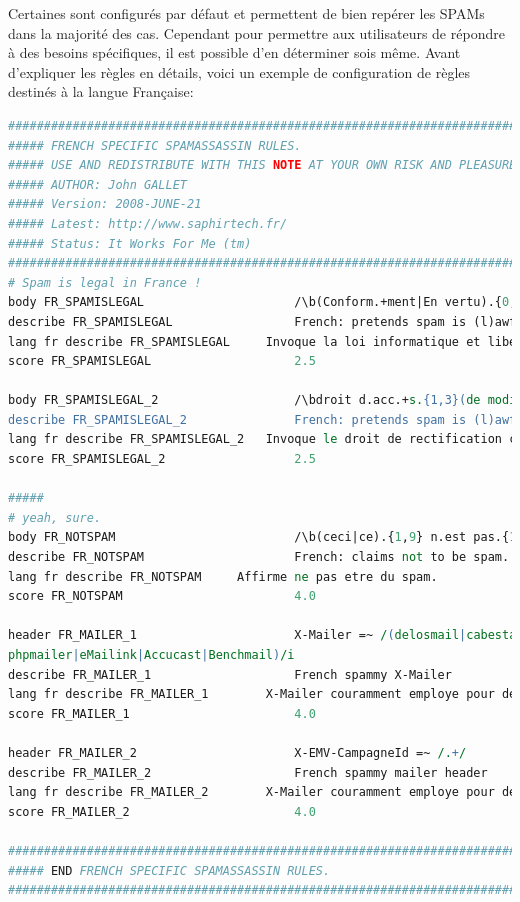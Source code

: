 \documentclass[a4paper,11pt]{article}
\begin{document}
Certaines sont configurés par défaut et permettent de
bien repérer les SPAMs dans la majorité des cas. Cependant pour permettre aux utilisateurs de répondre à des besoins spécifiques,
il est possible d'en déterminer sois même.
\linebreak
Avant d'expliquer les règles en détails, voici un exemple de configuration de règles destinés à la langue Française:
\begin{tiny}
\lstset{numbers=left}
\begin{lstlisting}[language=perl,frame=L,breaklines=true]
#####################################################################################
##### FRENCH SPECIFIC SPAMASSASSIN RULES. 
##### USE AND REDISTRIBUTE WITH THIS NOTE AT YOUR OWN RISK AND PLEASURE.
##### AUTHOR: John GALLET
##### Version: 2008-JUNE-21
##### Latest: http://www.saphirtech.fr/
##### Status: It Works For Me (tm)
#####################################################################################
# Spam is legal in France !
body FR_SPAMISLEGAL                     /\b(Conform.+ment|En vertu).{0,5}(article.{0,4}34.{0,4})?la loi\b/i
describe FR_SPAMISLEGAL                 French: pretends spam is (l)awful.
lang fr describe FR_SPAMISLEGAL		Invoque la loi informatique et libertes.
score FR_SPAMISLEGAL                    2.5

body FR_SPAMISLEGAL_2                   /\bdroit d.acc.+s.{1,3}(de modification)?.{0,5}de rectification\b/i
describe FR_SPAMISLEGAL_2               French: pretends spam is (l)awful.
lang fr describe FR_SPAMISLEGAL_2	Invoque le droit de rectification cnil.
score FR_SPAMISLEGAL_2                  2.5

#####
# yeah, sure.
body FR_NOTSPAM                         /\b(ceci|ce).{1,9} n.est pas.{1,5}spam\b/i
describe FR_NOTSPAM                     French: claims not to be spam.
lang fr describe FR_NOTSPAM		Affirme ne pas etre du spam.
score FR_NOTSPAM                        4.0

header FR_MAILER_1                      X-Mailer =~ /(delosmail|cabestan|ems|mp6|wamailer|
phpmailer|eMailink|Accucast|Benchmail)/i
describe FR_MAILER_1                    French spammy X-Mailer
lang fr describe FR_MAILER_1		X-Mailer couramment employe pour des spams en francais.
score FR_MAILER_1                       4.0

header FR_MAILER_2                      X-EMV-CampagneId =~ /.+/
describe FR_MAILER_2                    French spammy mailer header
lang fr describe FR_MAILER_2		X-Mailer couramment employe pour des spams en francais.
score FR_MAILER_2                       4.0

#####################################################################################
##### END FRENCH SPECIFIC SPAMASSASSIN RULES.
#####################################################################################

\end{lstlisting}
\end{tiny}
\end{document}
